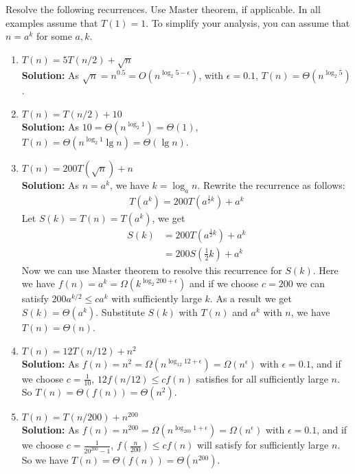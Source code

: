 \documentclass[letterpaper, 11pt]{article}
\begin{document}
Resolve the following recurrences. Use Master theorem, if applicable.
In all examples assume that $T(1) = 1.$
To simplify your analysis, you can assume that $n = a^k$ for some $a, k$.

\begin{enumerate}
\item $T(n) = 5T(n/2) + \sqrt{n}$\\
\textbf{Solution:} As $\sqrt{n} = n^{0.5} = O(n^{\log_{2}{5}-\epsilon})$, with $\epsilon=0.1$, $T(n)=\Theta(n^{\log_{2}{5}})$.

\item $T(n) = T(n/2) + 10$\\
\textbf{Solution:} As $10 = \Theta(n^{\log_{2}{1}})=\Theta(1)$,  $T(n)=\Theta(n^{\log_{2}{1}}\lg{n})=\Theta(\lg{n})$.

\item $T(n) = 200T(\sqrt{n}) + n$\\
\textbf{Solution:} As $n=a^k$, we have $k=\log_{a}{n}$. Rewrite the recurrence as follows:\\
\begin{align}
    T(a^k) = 200T(a^{\frac{1}{2}k})+a^k
\end{align}
Let $S(k)=T(n)=T(a^k)$, we get 
\begin{align}
    S(k)&=200T(a^{\frac{1}{2}k})+a^k\\
        &=200S(\frac{1}{2}k)+a^k
\end{align}
Now we can use Master theorem to resolve this recurrence for $S(k)$. Here we have $f(n)=a^k=\Omega(k^{\log_{2}{200}+\epsilon})$ and if we choose $c=200$ we can satisfy $200a^{k/2} \le ca^k$ with sufficiently large $k$. As a result we get $S(k)=\Theta(a^k)$. Substitute $S(k)$ with $T(n)$ and $a^k$ with $n$, we have $T(n)=\Theta(n)$.


\item $T(n) = 12T(n/12) + n^2$\\
\textbf{Solution:} As $f(n)=n^2=\Omega(n^{\log_{12}{12}+\epsilon})=\Omega(n^{\epsilon})$ with $\epsilon=0.1$, and if we choose $c=\frac{1}{10}$, $12f(n/12) \le cf(n)$ satisfies for all sufficiently large $n$. So $T(n)=\Theta(f(n))=\Theta(n^2)$.

\item $T(n) = T(n/200) + n^{200}$\\
\textbf{Solution:} As $f(n)=n^{200}=\Omega(n^{\log_{200}{1}+\epsilon})=\Omega(n^{\epsilon})$ with $\epsilon=0.1$, and if we choose $c=\frac{1}{20^{200}-1}$, $f(\frac{n}{200}) \le cf(n)$ will satisfy for sufficiently large $n$. So we have $T(n)=\Theta(f(n))=\Theta(n^{200})$.


\end{enumerate}
\end{document}
